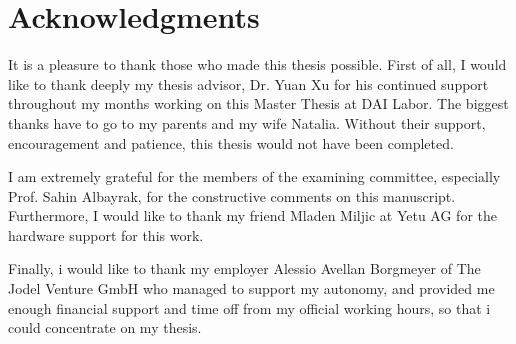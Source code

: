 \chapter*{Acknowledgments}
It is a pleasure to thank those who made this thesis possible. First of all, I would like to thank deeply my thesis advisor, Dr. Yuan Xu for his continued support throughout my months working on this Master Thesis at DAI Labor.
The biggest thanks have to go to my parents and my wife Natalia. Without their support, encouragement and patience, this thesis would not have been completed. 

I am extremely grateful for the members of the examining committee, especially Prof. Sahin Albayrak, for the constructive comments on this manuscript. Furthermore, I would like to thank my friend Mladen Miljic at Yetu AG for the hardware support for this work.

Finally, i would like to thank my employer Alessio Avellan Borgmeyer of The Jodel Venture GmbH who managed to support my autonomy, and provided me enough financial support and time off from my official working hours, so that i could concentrate on my thesis.
